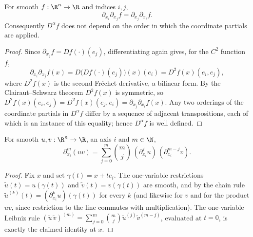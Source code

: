 \begin{proposition}
\label{prop:clairaut-partial-commute}
\leanok
For smooth $f : \R^n \to \R$ and indices $i, j$,
$$\partial_{x_i}\partial_{x_j} f = \partial_{x_j}\partial_{x_i} f.$$
Consequently $D^\alpha f$ does not depend on the order in which the coordinate
partials are applied.
\end{proposition}
\begin{proof}
\leanok
Since $\partial_{x_j} f = Df(\cdot)(e_j)$, differentiating again gives, for the
$C^2$ function $f$,
$$\partial_{x_i}\partial_{x_j} f(x) = D\big(Df(\cdot)(e_j)\big)(x)(e_i)
   = D^2 f(x)(e_i, e_j),$$
where $D^2 f(x)$ is the second Fréchet derivative, a bilinear form. By the
Clairaut--Schwarz theorem $D^2 f(x)$ is symmetric, so
$D^2 f(x)(e_i, e_j) = D^2 f(x)(e_j, e_i) = \partial_{x_j}\partial_{x_i} f(x)$.
Any two orderings of the coordinate partials in $D^\alpha f$ differ by a sequence
of adjacent transpositions, each of which is an instance of this equality; hence
$D^\alpha f$ is well defined.
\end{proof}

\begin{proposition}
\label{prop:iterated-leibniz-one-axis}
\leanok
For smooth $u, v : \R^n \to \R$, an axis $i$ and $m \in \N$,
$$\partial_{x_i}^m(uv) = \sum_{j=0}^m \binom{m}{j}\,
  (\partial_{x_i}^j u)\,(\partial_{x_i}^{m-j} v).$$
\end{proposition}
\begin{proof}
\leanok
Fix $x$ and set $\gamma(t) = x + t e_i$. The one-variable restrictions
$\tilde u(t) = u(\gamma(t))$ and $\tilde v(t) = v(\gamma(t))$ are smooth, and by
the chain rule $\tilde u^{(k)}(t) = (\partial_{x_i}^k u)(\gamma(t))$ for every $k$
(and likewise for $v$ and for the product $uv$, since restriction to the line
commutes with multiplication). The one-variable Leibniz rule
$(\tilde u\,\tilde v)^{(m)} = \sum_{j=0}^m \binom{m}{j}\tilde u^{(j)}\tilde v^{(m-j)}$,
evaluated at $t = 0$, is exactly the claimed identity at $x$.
\end{proof}

